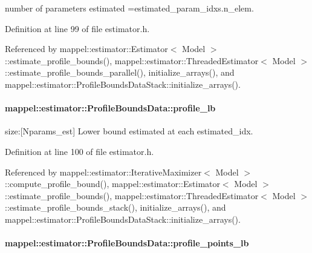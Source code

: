 number of parameters estimated =estimated\+\_\+param\+\_\+idxs.\+n\+\_\+elem. 



Definition at line 99 of file estimator.\+h.



Referenced by mappel\+::estimator\+::\+Estimator$<$ Model $>$\+::estimate\+\_\+profile\+\_\+bounds(), mappel\+::estimator\+::\+Threaded\+Estimator$<$ Model $>$\+::estimate\+\_\+profile\+\_\+bounds\+\_\+parallel(), initialize\+\_\+arrays(), and mappel\+::estimator\+::\+Profile\+Bounds\+Data\+Stack\+::initialize\+\_\+arrays().

\paragraph[{\texorpdfstring{profile\+\_\+lb}{profile_lb}}]{ mappel\+::estimator\+::\+Profile\+Bounds\+Data\+::profile\+\_\+lb}\hypertarget{structmappel_1_1estimator_1_1ProfileBoundsData_a0bc6ca65076892186f02bea98aa88268}{}\label{structmappel_1_1estimator_1_1ProfileBoundsData_a0bc6ca65076892186f02bea98aa88268}


size\+:\mbox{[}Nparams\+\_\+est\mbox{]} Lower bound estimated at each estimated\+\_\+idx. 



Definition at line 100 of file estimator.\+h.



Referenced by mappel\+::estimator\+::\+Iterative\+Maximizer$<$ Model $>$\+::compute\+\_\+profile\+\_\+bound(), mappel\+::estimator\+::\+Estimator$<$ Model $>$\+::estimate\+\_\+profile\+\_\+bounds(), mappel\+::estimator\+::\+Threaded\+Estimator$<$ Model $>$\+::estimate\+\_\+profile\+\_\+bounds\+\_\+stack(), initialize\+\_\+arrays(), and mappel\+::estimator\+::\+Profile\+Bounds\+Data\+Stack\+::initialize\+\_\+arrays().

\paragraph[{\texorpdfstring{profile\+\_\+points\+\_\+lb}{profile_points_lb}}]{ mappel\+::estimator\+::\+Profile\+Bounds\+Data\+::profile\+\_\+points\+\_\+lb}\hypertarget{structmappel_1_1estimator_1_1ProfileBoundsData_ad6746d8a2946cba52c8c207fc0f57ef7}{}\label{structmappel_1_1estimator_1_1ProfileBoundsData_ad6746d8a2946cba52c8c207fc0f57ef7}


